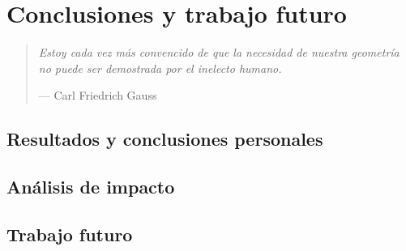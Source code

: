 \chapter{Conclusiones y trabajo futuro}

\begin{quote}
    \textit{Estoy cada vez más convencido de que la necesidad de nuestra geometría no puede ser demostrada por el inelecto humano.}
    
    \hfill --- Carl Friedrich Gauss
\end{quote}

\section{Resultados y conclusiones personales}


\section{Análisis de impacto}


\section{Trabajo futuro}
